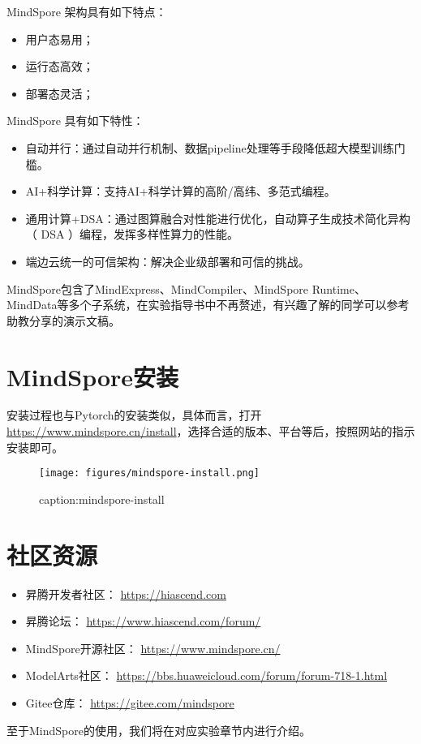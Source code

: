 MindSpore 架构具有如下特点：
\begin{itemize}
    \item 用户态易用；
    \item 运行态高效；
    \item 部署态灵活；
\end{itemize}

MindSpore 具有如下特性：
\begin{itemize}
    \item 自动并行：通过自动并行机制、数据pipeline处理等手段降低超大模型训练门槛。
    \item AI+科学计算：支持AI+科学计算的高阶/高纬、多范式编程。
    \item 通用计算+DSA：通过图算融合对性能进行优化，自动算子生成技术简化异构（ DSA ）编程，发挥多样性算力的性能。
    \item 端边云统一的可信架构：解决企业级部署和可信的挑战。
\end{itemize}


MindSpore包含了MindExpress、MindCompiler、MindSpore Runtime、MindData等多个子系统，在实验指导书中不再赘述，有兴趣了解的同学可以参考助教分享的演示文稿。


\section{MindSpore安装}

安装过程也与Pytorch的安装类似，具体而言，打开\url{https://www.mindspore.cn/install}，选择合适的版本、平台等后，按照网站的指示安装即可。

\begin{figure}[htbp]
	\centering
	\texttt{[image: figures/mindspore-install.png]}
	\caption{caption:mindspore-install}
	\label{fig:mindspore-install}
\end{figure}

\section{社区资源}
\begin{itemize}
    \item 昇腾开发者社区： \url{https://hiascend.com}
    \item 昇腾论坛： \url{https://www.hiascend.com/forum/}
    \item MindSpore开源社区：  \url{https://www.mindspore.cn/}
    \item ModelArts社区：  \url{https://bbs.huaweicloud.com/forum/forum-718-1.html}
    \item Gitee仓库： \url{https://gitee.com/mindspore}
\end{itemize}



\vspace{3em}
至于MindSpore的使用，我们将在对应实验章节内进行介绍。